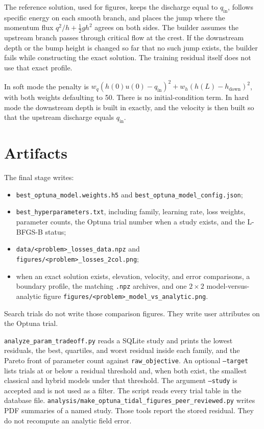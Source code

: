 \documentclass[11pt]{article}
\begin{document}
The reference solution, used for figures, keeps the discharge equal to \(q_{\mathrm{in}}\), follows specific energy on each smooth branch, and places the jump where the momentum flux \(q^{2}/h+\tfrac12 g h^{2}\) agrees on both sides.
The builder assumes the upstream branch passes through critical flow at the crest.
If the downstream depth or the bump height is changed so far that no such jump exists, the builder fails while constructing the exact solution.
The training residual itself does not use that exact profile.

In soft mode the penalty is \(w_{q}(h(0)u(0)-q_{\mathrm{in}})^{2}+w_{h}(h(L)-h_{\mathrm{down}})^{2}\), with both weights defaulting to 50.
There is no initial-condition term.
In hard mode the downstream depth is built in exactly, and the velocity is then built so that the upstream discharge equals \(q_{\mathrm{in}}\).

\section{Artifacts}

The final stage writes:

\begin{itemize}[leftmargin=1.4em]
\item \texttt{best\_optuna\_model.weights.h5} and \texttt{best\_optuna\_model\_config.json};
\item \texttt{best\_hyperparameters.txt}, including family, learning rate, loss weights, parameter counts, the Optuna trial number when a study exists, and the L-BFGS-B status;
\item \texttt{data/<problem>\_losses\_data.npz} and \texttt{figures/<problem>\_losses\_2col.png};
\item when an exact solution exists, elevation, velocity, and error comparisons, a boundary profile, the matching \texttt{.npz} archives, and one \(2\times 2\) model-versus-analytic figure \texttt{figures/<problem>\_model\_vs\_analytic.png}.
\end{itemize}

Search trials do not write those comparison figures.
They write user attributes on the Optuna trial.

\texttt{analyze\_param\_tradeoff.py} reads a SQLite study and prints the lowest residuals, the best, quartiles, and worst residual inside each family, and the Pareto front of parameter count against \texttt{raw\_objective}.
An optional \texttt{--target} lists trials at or below a residual threshold and, when both exist, the smallest classical and hybrid models under that threshold.
The argument \texttt{--study} is accepted and is not used as a filter.
The script reads every trial table in the database file.
\texttt{analysis/make\_optuna\_tidal\_figures\_peer\_reviewed.py} writes PDF summaries of a named study.
Those tools report the stored residual.
They do not recompute an analytic field error.
\end{document}
